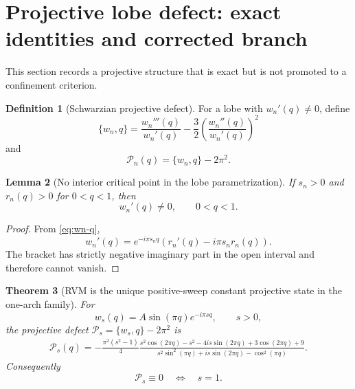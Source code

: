\documentclass[11pt]{amsart}
\numberwithin{equation}{section}
\newtheorem{theorem}{Theorem}[section]
\newtheorem{lemma}[theorem]{Lemma}
\theoremstyle{definition}
\newtheorem{definition}[theorem]{Definition}
\theoremstyle{remark}
\newcommand{\Pcal}{\mathcal P}
\begin{document}
\section{Projective lobe defect: exact identities and corrected branch}
\label{sec:schwarzian}

This section records a projective structure that is exact but is not promoted to a confinement criterion.

\begin{definition}[Schwarzian projective defect]
\label{def:projective-defect}
For a lobe with $w_n'(q)\neq0$, define
\begin{equation}
\{w_n,q\}
=\frac{w_n'''(q)}{w_n'(q)}
-\frac32\left(\frac{w_n''(q)}{w_n'(q)}\right)^2
\label{eq:Schwarzian-definition}
\end{equation}
and
\begin{equation}
\Pcal_n(q)=\{w_n,q\}-2\pi^2.
\label{eq:Pcal-definition}
\end{equation}
\end{definition}

\begin{lemma}[No interior critical point in the lobe parametrization]
\label{lem:no-critical-point}
If $s_n>0$ and $r_n(q)>0$ for $0<q<1$, then
\begin{equation}
w_n'(q)\neq0,
\qquad 0<q<1.
\label{eq:wn-prime-nonzero}
\end{equation}
\end{lemma}

\begin{proof}
From \eqref{eq:wn-q},
\begin{equation}
w_n'(q)=e^{-i\pi s_nq}\left(r_n'(q)-i\pi s_nr_n(q)\right).
\label{eq:wn-prime-factor}
\end{equation}
The bracket has strictly negative imaginary part in the open interval and therefore cannot vanish.
\end{proof}

\begin{theorem}[RVM is the unique positive-sweep constant projective state in the one-arch family]
\label{thm:Schwarzian-arch}
For
\begin{equation}
w_s(q)=A\sin(\pi q)e^{-i\pi sq},
\qquad s>0,
\label{eq:ws-definition}
\end{equation}
the projective defect $\Pcal_s=\{w_s,q\}-2\pi^2$ is
\begin{multline}
\Pcal_s(q)
=-\frac{\pi^2(s^2-1)}{4}
\frac{s^2\cos(2\pi q)-s^2-4is\sin(2\pi q)+3\cos(2\pi q)+9}
{s^2\sin^2(\pi q)+is\sin(2\pi q)-\cos^2(\pi q)}.
\label{eq:Pcal-s-explicit}
\end{multline}
Consequently
\begin{equation}
\Pcal_s\equiv0
\quad\Longleftrightarrow\quad
s=1.
\label{eq:Pcal-s-iff}
\end{equation}
\end{theorem}
\end{document}
